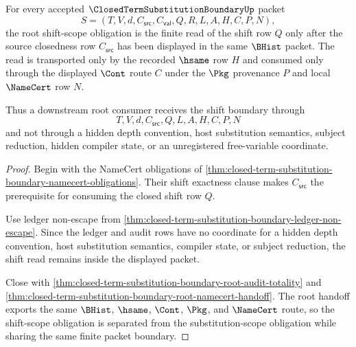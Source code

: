 \begin{theorem}
\label{thm:closed-term-substitution-boundary-root-shift-scope}
For every accepted $\ClosedTermSubstitutionBoundaryUp$ packet
$$
S=(T,V,d,C_{\mathsf{src}},C_{\mathsf{val}},Q,R,L,A,H,C,P,N),
$$
the root shift-scope obligation is the finite read of the shift row $Q$ only after the source closedness row $C_{\mathsf{src}}$ has been displayed in the same $\BHist$ packet. The read is transported only by the recorded $\hsame$ row $H$ and consumed only through the displayed $\Cont$ route $C$ under the $\Pkg$ provenance $P$ and local $\NameCert$ row $N$.

Thus a downstream root consumer receives the shift boundary through
$$
T,V,d,C_{\mathsf{src}},Q,L,A,H,C,P,N
$$
and not through a hidden depth convention, host substitution semantics, subject reduction, hidden compiler state, or an unregistered free-variable coordinate.
\end{theorem}
\begin{proof}
Begin with the NameCert obligations of \autoref{thm:closed-term-substitution-boundary-namecert-obligations}. Their shift exactness clause makes $C_{\mathsf{src}}$ the prerequisite for consuming the closed shift row $Q$.

Use ledger non-escape from \autoref{thm:closed-term-substitution-boundary-ledger-non-escape}. Since the ledger and audit rows have no coordinate for a hidden depth convention, host substitution semantics, compiler state, or subject reduction, the shift read remains inside the displayed packet.

Close with \autoref{thm:closed-term-substitution-boundary-root-audit-totality} and \autoref{thm:closed-term-substitution-boundary-root-namecert-handoff}. The root handoff exports the same $\BHist$, $\hsame$, $\Cont$, $\Pkg$, and $\NameCert$ route, so the shift-scope obligation is separated from the substitution-scope obligation while sharing the same finite packet boundary.
\end{proof}

